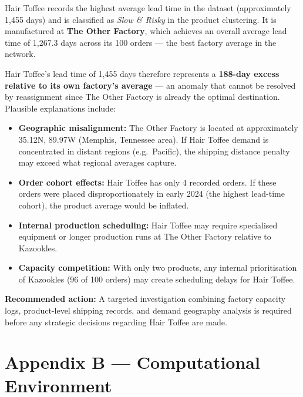 \documentclass[12pt, a4paper]{article}
\begin{document}
Hair Toffee records the highest average lead time in the
dataset (approximately 1,455 days) and is classified as
\emph{Slow \& Risky} in the product clustering. It is
manufactured at \textbf{The Other Factory}, which achieves
an overall average lead time of 1,267.3 days across its
100 orders --- the best factory average in the network.

Hair Toffee's lead time of 1,455 days therefore represents
a \textbf{188-day excess relative to its own factory's
average} --- an anomaly that cannot be resolved by
reassignment since The Other Factory is already the optimal
destination. Plausible explanations include:

\begin{itemize}[leftmargin=*]
    \item \textbf{Geographic misalignment:} The Other
          Factory is located at approximately
          35.12\textdegree N, 89.97\textdegree W
          (Memphis, Tennessee area).
          If Hair Toffee demand is concentrated in
          distant regions (e.g.\ Pacific), the shipping
          distance penalty may exceed what regional
          averages capture.
    \item \textbf{Order cohort effects:} Hair Toffee has
          only 4 recorded orders. If these orders were
          placed disproportionately in early 2024
          (the highest lead-time cohort), the product
          average would be inflated.
    \item \textbf{Internal production scheduling:}
          Hair Toffee may require specialised equipment
          or longer production runs at The Other Factory
          relative to Kazookles.
    \item \textbf{Capacity competition:} With only two
          products, any internal prioritisation of
          Kazookles (96 of 100 orders) may create
          scheduling delays for Hair Toffee.
\end{itemize}

\textbf{Recommended action:} A targeted investigation
combining factory capacity logs, product-level shipping
records, and demand geography analysis is required before
any strategic decisions regarding Hair Toffee are made.

\section*{Appendix B --- Computational Environment}
\end{document}

